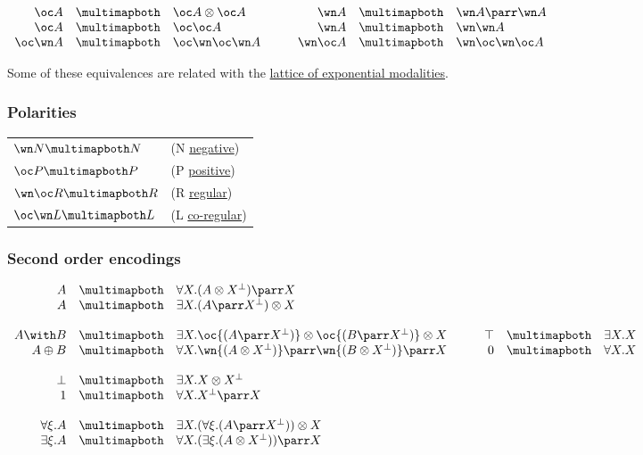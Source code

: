 \(\begin{array}{rclcrcl}
  \oc A & \linequiv&  \oc A\tens\oc A & \quad&  
  \wn A & \linequiv&  \wn A\parr\wn A\\
  \oc A & \linequiv&  \oc\oc A & \quad&  \wn A & \linequiv&  \wn\wn A\\
  \oc\wn A & \linequiv&  \oc\wn\oc\wn A & \quad&  \wn\oc A & \linequiv&  \wn\oc\wn\oc A\\
\end{array}\)

Some of these equivalences are related with the
\hyperref[lattice-of-exponential-modalities]{lattice of exponential modalities}.

\subsubsection{Polarities}\label{polarities}

\begin{longtable}[]{@{}ll@{}}
\toprule
\(\wn N \linequiv N\) & (N \hyperref[negative-formula]{negative})\tabularnewline
\(\oc P \linequiv P\) & (P \hyperref[positive-formula]{positive})\tabularnewline
\(\wn\oc R \linequiv R\) & (R \hyperref[regular-formula]{regular})\tabularnewline
\(\oc\wn L \linequiv L\) & (L \hyperref[regular-formula]{co-regular})\tabularnewline
\bottomrule
\end{longtable}

\subsubsection{Second order encodings}\label{second-order-encodings}

\(\begin{array}{rclcrcl}
  A & \linequiv & \forall X . (A \tens X\orth) \parr X \\
  A & \linequiv & \exists X . (A \parr X\orth) \tens X \\
\\
  A \with B & \linequiv&  \exists X . \oc{(A \parr X\orth)} \tens \oc{(B \parr X\orth)} \tens X & \quad&  \top & \linequiv&  \exists X . X \\
  A \plus B & \linequiv&  \forall X . \wn{(A \tens X\orth)} \parr \wn{(B \tens X\orth)} \parr X & \quad&  \zero & \linequiv&  \forall X . X \\
\\
 \bot & \linequiv&  \exists X . X\tens X\orth \\
 \one & \linequiv&  \forall X . X\orth\parr X \\
\\
  \forall \xi . A & \linequiv&  \exists X . (\forall \xi . (A \parr X\orth)) \tens X \\
  \exists \xi . A & \linequiv&  \forall X . (\exists \xi . (A \tens X\orth)) \parr X
\end{array}\)

